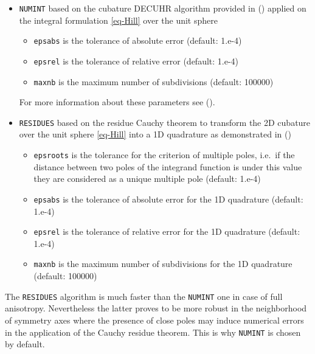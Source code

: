 \documentclass[
  letterpaper,
  DIV=11,
  numbers=noendperiod]{scrreprt}
\providecommand{\tightlist}{%
  \setlength{\itemsep}{0pt}\setlength{\parskip}{0pt}}\usepackage{longtable,booktabs,array}
\begin{document}
\begin{itemize}
\item
  \texttt{NUMINT} based on the cubature DECUHR algorithm provided in
  () applied on the
  integral formulation \ref{eq-Hill} over the unit sphere

  \begin{itemize}
  \tightlist
  \item
    \texttt{epsabs} is the tolerance of absolute error (default: 1.e-4)
  \item
    \texttt{epsrel} is the tolerance of relative error (default: 1.e-4)
  \item
    \texttt{maxnb} is the maximum number of subdivisions (default:
    100000)
  \end{itemize}

  For more information about these parameters see
  ().
\item
  \texttt{RESIDUES} based on the residue Cauchy theorem to transform the
  2D cubature over the unit sphere \ref{eq-Hill} into a 1D quadrature as
  demonstrated in ()

  \begin{itemize}
  \tightlist
  \item
    \texttt{epsroots} is the tolerance for the criterion of multiple
    poles, i.e.~if the distance between two poles of the integrand
    function is under this value they are considered as a unique
    multiple pole (default: 1.e-4)
  \item
    \texttt{epsabs} is the tolerance of absolute error for the 1D
    quadrature (default: 1.e-4)
  \item
    \texttt{epsrel} is the tolerance of relative error for the 1D
    quadrature (default: 1.e-4)
  \item
    \texttt{maxnb} is the maximum number of subdivisions for the 1D
    quadrature (default: 100000)
  \end{itemize}
\end{itemize}

\begin{tcolorbox}[enhanced jigsaw, left=2mm, bottomrule=.15mm, colbacktitle=quarto-callout-warning-color!10!white, colback=white, colframe=quarto-callout-warning-color-frame, rightrule=.15mm, bottomtitle=1mm, toptitle=1mm, titlerule=0mm, title=\textcolor{quarto-callout-warning-color}{\faExclamationTriangle}\hspace{0.5em}{Warning}, toprule=.15mm, arc=.35mm, opacityback=0, opacitybacktitle=0.6, leftrule=.75mm, breakable, coltitle=black]

The \texttt{RESIDUES} algorithm is much faster than the \texttt{NUMINT}
one in case of full anisotropy. Nevertheless the latter proves to be
more robust in the neighborhood of symmetry axes where the presence of
close poles may induce numerical errors in the application of the Cauchy
residue theorem. This is why \texttt{NUMINT} is chosen by default.

\end{tcolorbox}
\end{document}
